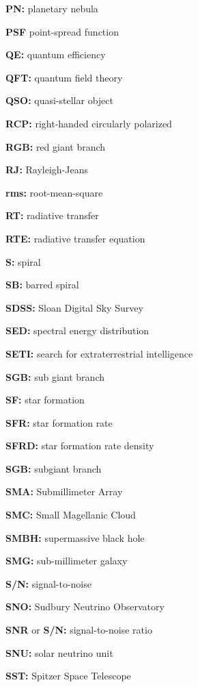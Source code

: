 \documentclass[a4paper,10pt]{article}
\begin{document}
{\noindent}\textbf{PN:} planetary nebula

{\noindent}\textbf{PSF} point-spread function

{\noindent}\textbf{QE:} quantum efficiency

{\noindent}\textbf{QFT:} quantum field theory

{\noindent}\textbf{QSO:} quasi-stellar object

{\noindent}\textbf{RCP:} right-handed circularly polarized

{\noindent}\textbf{RGB:} red giant branch

{\noindent}\textbf{RJ:} Rayleigh-Jeans

{\noindent}\textbf{rms:} root-mean-square

{\noindent}\textbf{RT:} radiative transfer

{\noindent}\textbf{RTE:} radiative transfer equation

{\noindent}\textbf{S:} spiral

{\noindent}\textbf{SB:} barred spiral

{\noindent}\textbf{SDSS:} Sloan Digital Sky Survey

{\noindent}\textbf{SED:} spectral energy distribution

{\noindent}\textbf{SETI:} search for extraterrestrial intelligence

{\noindent}\textbf{SGB:} sub giant branch

{\noindent}\textbf{SF:} star formation

{\noindent}\textbf{SFR:} star formation rate

{\noindent}\textbf{SFRD:} star formation rate density

{\noindent}\textbf{SGB:} subgiant branch

{\noindent}\textbf{SMA:} Submillimeter Array

{\noindent}\textbf{SMC:} Small Magellanic Cloud

{\noindent}\textbf{SMBH:} supermassive black hole

{\noindent}\textbf{SMG:} sub-millimeter galaxy

{\noindent}\textbf{S/N:} signal-to-noise

{\noindent}\textbf{SNO:} Sudbury Neutrino Observatory

{\noindent}\textbf{SNR} or \textbf{S/N:} signal-to-noise ratio

{\noindent}\textbf{SNU:} solar neutrino unit

{\noindent}\textbf{SST:} Spitzer Space Telescope
\end{document}

